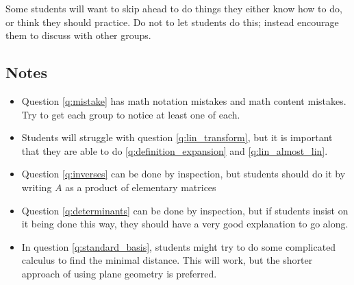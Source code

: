 \documentclass[red]{tutorial}
\theoremstyle{definition}
\theoremstyle{theorem}
\begin{document}
{\begin{instructions}
  Some students will want to skip ahead to do things 
  they either know how to do, or think they should 
  practice. Do not to let students do this; instead
  encourage them to discuss with other groups.
  \subsection*{Notes}
  \begin{itemize}
    \item
      Question \ref{q:mistake} has math notation mistakes and math content
      mistakes. Try to get each group to notice at least one of each.
    \item
      Students will struggle with question \ref{q:lin_transform}, but it is
      important that they are able to do \ref{q:definition_expansion} and
      \ref{q:lin_almost_lin}.
    \item
      Question \ref{q:inverses} can be done by 
      inspection, but students should do it by 
      writing $A$ as a product of elementary matrices
    \item
      Question \ref{q:determinants} can be done by 
      inspection, but if students insist on it 
      being done this way, they should have a very good
      explanation to go along.
    \item
      In question \ref{q:standard_basis}, students might try to do some
      complicated calculus to find the minimal distance. This will work, but
      the shorter approach of using plane geometry is preferred.
  \end{itemize}
\end{instructions}
}
\end{document}
